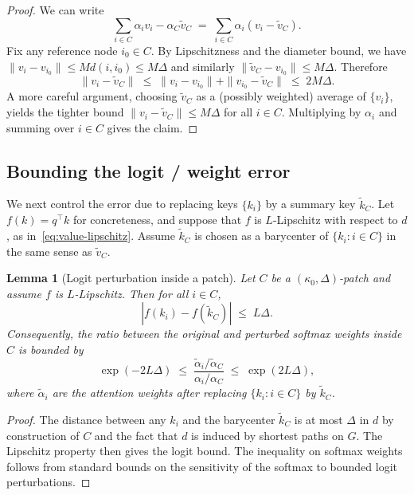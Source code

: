 \documentclass{article}
\theoremstyle{plain}
\newtheorem{lemma}{Lemma}
\theoremstyle{definition}
\theoremstyle{remark}
\begin{document}
\begin{proof}
We can write
\begin{equation}
  \sum_{i\in C} \alpha_i v_i - \alpha_C \tilde{v}_C
  \;=\; \sum_{i\in C} \alpha_i (v_i - \tilde{v}_C).
\end{equation}
Fix any reference node $i_0\in C$. By Lipschitzness and the diameter bound, we have $\|v_i - v_{i_0}\|\le M d(i,i_0)\le M\Delta$ and similarly $\|\tilde{v}_C - v_{i_0}\|\le M\Delta$. Therefore
\begin{equation}
  \|v_i - \tilde{v}_C\|
  \;\le\; \|v_i - v_{i_0}\| + \|v_{i_0} - \tilde{v}_C\|
  \;\le\; 2M\Delta.
\end{equation}
A more careful argument, choosing $\tilde{v}_C$ as a (possibly weighted) average of $\{v_i\}$, yields the tighter bound $\|v_i - \tilde{v}_C\|\le M\Delta$ for all $i\in C$. Multiplying by $\alpha_i$ and summing over $i\in C$ gives the claim.
\end{proof}

\subsection{Bounding the logit / weight error}

We next control the error due to replacing keys $\{k_i\}$ by a summary key $\tilde{k}_C$. Let $f(k)=q^\top k$ for concreteness, and suppose that $f$ is $L$-Lipschitz with respect to $d$, as in~\eqref{eq:value-lipschitz}. Assume $\tilde{k}_C$ is chosen as a barycenter of $\{k_i : i\in C\}$ in the same sense as $\tilde{v}_C$.

\begin{lemma}[Logit perturbation inside a patch]
\label{lem:logit-error}
Let $C$ be a $(\kappa_0,\Delta)$-patch and assume $f$ is $L$-Lipschitz. Then for all $i\in C$,
\begin{equation}
  |f(k_i) - f(\tilde{k}_C)| \;\le\; L \Delta.
\end{equation}
Consequently, the ratio between the original and perturbed softmax weights inside $C$ is bounded by
\begin{equation}
  \exp(-2L\Delta) \;\le\; \frac{\tilde{\alpha}_i / \tilde{\alpha}_C}{\alpha_i / \alpha_C} \;\le\; \exp(2L\Delta),
\end{equation}
where $\tilde{\alpha}_i$ are the attention weights after replacing $\{k_i : i\in C\}$ by $\tilde{k}_C$.
\end{lemma}

\begin{proof}
The distance between any $k_i$ and the barycenter $\tilde{k}_C$ is at most $\Delta$ in $d$ by construction of $C$ and the fact that $d$ is induced by shortest paths on $G$. The Lipschitz property then gives the logit bound. The inequality on softmax weights follows from standard bounds on the sensitivity of the softmax to bounded logit perturbations.
\end{proof}
\end{document}
